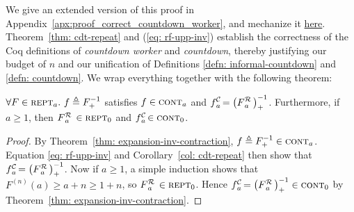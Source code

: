 We give an extended version of this proof in
Appendix~\ref{apx:proof_correct_countdown_worker},
and mechanize it
\href{https://github.com/inv-ack/inv-ack/blob/7270e64a2600b771f2b1b1b151f7d13fb2ae6c97/countdown.v#L191-L217}{here}.
Theorem~\ref{thm: cdt-repeat} and (\ref{eq: rf-upp-inv}) establish the correctness of the Coq definitions of \emph{countdown worker} and \emph{countdown}, thereby justifying our budget of $n$ and our unification of
Definitions \ref{defn: informal-countdown} and \ref{defn: countdown}. We wrap everything together with the following theorem:
\begin{thm} \label{thm: cdt-inv-rf}
	$\forall F\in \text{\scshape{rept}}_a.~f\triangleq F^{-1}_+$ satisfies $f \in \text{\scshape{cont}}_{a}$ and $\displaystyle \cdt{f}{a} \ = \left(\rf{F}{a}\ \right)^{-1}_+$. Furthermore, if $a\ge 1$, then $\rf{F}{a}\ \in \repeatable_0$ and $\cdt{f}{a}\ \in \contract_0$.
\end{thm}
\begin{proof}
	By Theorem~\ref{thm: expansion-inv-contraction}, $f\triangleq F^{-1}_+ \in \text{\scshape{cont}}_a$.
	Equation \ref{eq: rf-upp-inv} and Corollary~\ref{col: cdt-repeat}
	then show that $\cdt{f}{a}\ = \left(\rf{F}{a}\ \right)^{-1}_+$.
	Now if $a\ge 1$, a simple induction shows that $F^{(n)}(a)\ge a + n\ge 1 + n$, so $\rf{F}{a}\ \in \repeatable_0$. Hence $\cdt{f}{a} \ = \left(\rf{F}{a}\ \right)^{-1}_+ \in \contract_0$ by Theorem~\ref{thm: expansion-inv-contraction}.
\end{proof}

